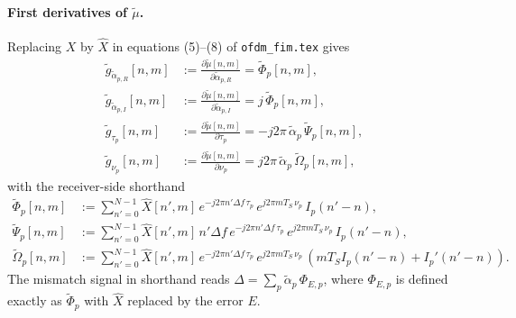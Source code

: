 \documentclass[11pt]{article}
\begin{document}
\paragraph{First derivatives of \(\tilde{\mu}\).} Replacing \(X\) by \(\hat{X}\) in equations (5)--(8) of \texttt{ofdm\_fim.tex} gives
\begin{align}
    \tilde{g}_{\tilde{\alpha}_{p,R}}[n,m] &:= \frac{\partial \tilde{\mu}[n,m]}{\partial \tilde{\alpha}_{p,R}} = \tilde{\Phi}_p[n,m], \\
    \tilde{g}_{\tilde{\alpha}_{p,I}}[n,m] &:= \frac{\partial \tilde{\mu}[n,m]}{\partial \tilde{\alpha}_{p,I}} = j\, \tilde{\Phi}_p[n,m], \\
    \tilde{g}_{\tau_p}[n,m] &:= \frac{\partial \tilde{\mu}[n,m]}{\partial \tau_p} = -j2\pi\, \tilde{\alpha}_p\, \tilde{\Psi}_p[n,m], \\
    \tilde{g}_{\nu_p}[n,m] &:= \frac{\partial \tilde{\mu}[n,m]}{\partial \nu_p} = j2\pi\, \tilde{\alpha}_p\, \tilde{\Omega}_p[n,m],
\end{align}
with the receiver-side shorthand
\begin{align}
    \tilde{\Phi}_p[n,m]   &:= \sum_{n'=0}^{N-1} \hat{X}[n',m]\, e^{-j2\pi n'\Delta f\, \tau_p}\, e^{j2\pi mT_S\, \nu_p}\, I_p(n'-n), \\
    \tilde{\Psi}_p[n,m]   &:= \sum_{n'=0}^{N-1} \hat{X}[n',m]\, n'\Delta f\, e^{-j2\pi n'\Delta f\, \tau_p}\, e^{j2\pi mT_S\, \nu_p}\, I_p(n'-n), \\
    \tilde{\Omega}_p[n,m] &:= \sum_{n'=0}^{N-1} \hat{X}[n',m]\, e^{-j2\pi n'\Delta f\, \tau_p}\, e^{j2\pi mT_S\, \nu_p}\, \left( mT_S I_p(n'-n) + I_p'(n'-n) \right).
\end{align}
The mismatch signal in shorthand reads \(\Delta = \sum_p \tilde{\alpha}_p\, \Phi_{E,p}\), where \(\Phi_{E,p}\) is defined exactly as \(\tilde{\Phi}_p\) with \(\hat{X}\) replaced by the error \(E\).
\end{document}

